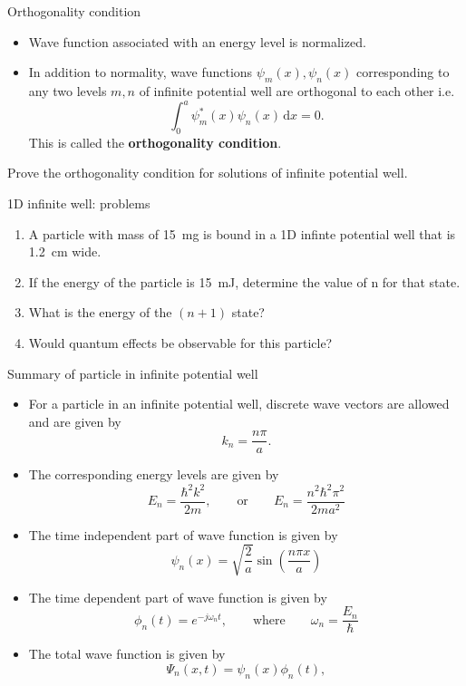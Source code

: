%
\begin{frame}{Orthogonality condition}
	\begin{itemize}
		\item Wave function associated with an energy level is normalized.
		\item In addition to normality,  wave functions \(\psi_m(x), \psi_n(x)\) corresponding to any two levels \(m, n\) of infinite potential well are orthogonal to each other i.e.
		\[
		\int_{0}^{a} \psi_m^*(x) \psi_n(x) \, \mathrm{d}x = 0.
		\]
		This is called the \textbf{orthogonality condition}.
	\end{itemize}
	\begin{theorem}
		Prove the orthogonality condition for solutions of infinite potential well.
	\end{theorem}
\end{frame}
%
\begin{frame}{1D infinite well: problems}
	\begin{problem}
		\begin{enumerate}
			\item A particle with mass of \SI{15}{\milli\gram} is bound in a 1D infinte potential well that is \SI{1.2}{\centi\metre} wide.
			\item If the energy of the particle is \SI{15}{\milli\joule}, determine the value of n for that state.
			\item What is the energy of the \((n+1)\) state?
			\item Would quantum effects be observable for this particle?
		\end{enumerate}
	\end{problem}
\end{frame}
%
\begin{frame}{Summary of particle in infinite potential well}
	\begin{itemize}
		\item For a particle in an infinite potential well, discrete wave vectors are allowed and are given by
		\[
		k_n = \frac{n\pi}{a}.
		\]
		\item The corresponding energy levels are given by
		\[
		E_n = \frac{\hbar^2 k^2}{2m}, \qquad \text{or} \qquad E_n = \frac{n^2\hbar^2\pi^2}{2ma^2}
		\]
		\item The time independent part of wave function is given by
		\[
		\psi_n(x) = \sqrt{\frac{2}{a}} \sin\left(\frac{n\pi x}{a}\right)
		\]
		\item The time dependent part of wave function is given by
		\[
		\phi_n(t) = e^{-j\omega_n t}, \qquad \text{where} \qquad \omega_n = \frac{E_n}{\hbar}
		\]
		\item The total wave function is given by
		\[
		\Psi_n(x, t) = \psi_n(x)\phi_n(t),
		\]
	\end{itemize}
\end{frame}
